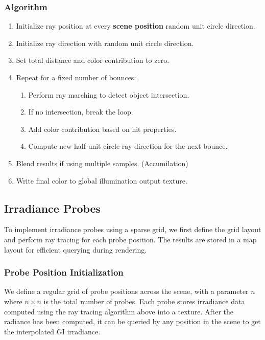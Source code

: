 \documentclass[acmtog, nonacm]{acmart}
\begin{document}
\subsubsection{Algorithm}
\begin{enumerate}
  \item Initialize ray position at every \textbf{scene position} random unit circle direction.
  \item Initialize ray direction with random unit circle direction.
  \item Set total distance and color contribution to zero.
  \item Repeat for a fixed number of bounces:
  \begin{enumerate}
    \item Perform ray marching to detect object intersection.
    \item If no intersection, break the loop.
    \item Add color contribution based on hit properties.
    \item Compute new half-unit circle ray direction for the next bounce.
  \end{enumerate}
  \item Blend results if using multiple samples. (Accumilation)
  \item Write final color to global illumination output texture.
\end{enumerate}

\subsection{Irradiance Probes}
To implement irradiance probes using a sparse grid, we first define the grid layout and perform ray tracing for each probe position. The results are stored in a map layout for efficient querying during rendering.

\subsubsection{Probe Position Initialization}
We define a regular grid of probe positions across the scene, with a parameter \( n \) where \( n \times n \) is the total number of probes. Each probe stores irradiance data computed using the ray tracing algorithm above into a texture. After the radiance has been computed, it can be queried by any position in the scene to get the interpolated GI irradiance.
\end{document}
